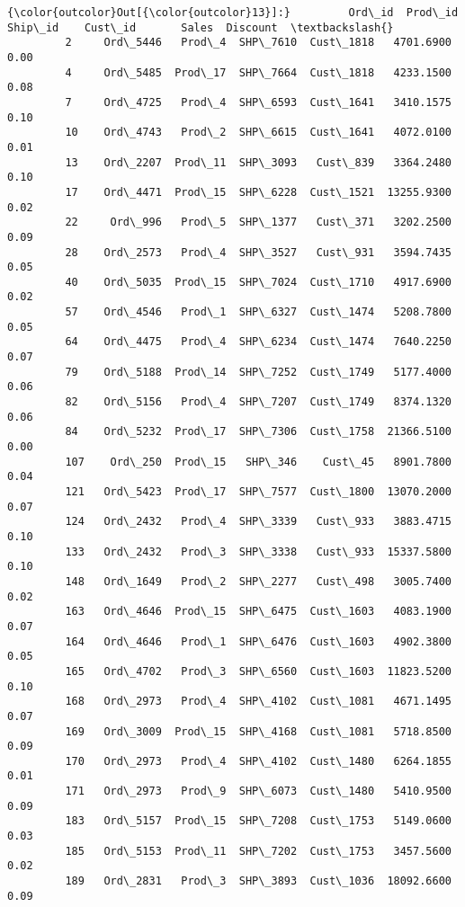 \documentclass[11pt]{article}
\begin{document}
\begin{Verbatim}[commandchars=\\\{\}]
{\color{outcolor}Out[{\color{outcolor}13}]:}         Ord\_id  Prod\_id   Ship\_id    Cust\_id       Sales  Discount  \textbackslash{}
         2     Ord\_5446   Prod\_4  SHP\_7610  Cust\_1818   4701.6900      0.00   
         4     Ord\_5485  Prod\_17  SHP\_7664  Cust\_1818   4233.1500      0.08   
         7     Ord\_4725   Prod\_4  SHP\_6593  Cust\_1641   3410.1575      0.10   
         10    Ord\_4743   Prod\_2  SHP\_6615  Cust\_1641   4072.0100      0.01   
         13    Ord\_2207  Prod\_11  SHP\_3093   Cust\_839   3364.2480      0.10   
         17    Ord\_4471  Prod\_15  SHP\_6228  Cust\_1521  13255.9300      0.02   
         22     Ord\_996   Prod\_5  SHP\_1377   Cust\_371   3202.2500      0.09   
         28    Ord\_2573   Prod\_4  SHP\_3527   Cust\_931   3594.7435      0.05   
         40    Ord\_5035  Prod\_15  SHP\_7024  Cust\_1710   4917.6900      0.02   
         57    Ord\_4546   Prod\_1  SHP\_6327  Cust\_1474   5208.7800      0.05   
         64    Ord\_4475   Prod\_4  SHP\_6234  Cust\_1474   7640.2250      0.07   
         79    Ord\_5188  Prod\_14  SHP\_7252  Cust\_1749   5177.4000      0.06   
         82    Ord\_5156   Prod\_4  SHP\_7207  Cust\_1749   8374.1320      0.06   
         84    Ord\_5232  Prod\_17  SHP\_7306  Cust\_1758  21366.5100      0.00   
         107    Ord\_250  Prod\_15   SHP\_346    Cust\_45   8901.7800      0.04   
         121   Ord\_5423  Prod\_17  SHP\_7577  Cust\_1800  13070.2000      0.07   
         124   Ord\_2432   Prod\_4  SHP\_3339   Cust\_933   3883.4715      0.10   
         133   Ord\_2432   Prod\_3  SHP\_3338   Cust\_933  15337.5800      0.10   
         148   Ord\_1649   Prod\_2  SHP\_2277   Cust\_498   3005.7400      0.02   
         163   Ord\_4646  Prod\_15  SHP\_6475  Cust\_1603   4083.1900      0.07   
         164   Ord\_4646   Prod\_1  SHP\_6476  Cust\_1603   4902.3800      0.05   
         165   Ord\_4702   Prod\_3  SHP\_6560  Cust\_1603  11823.5200      0.10   
         168   Ord\_2973   Prod\_4  SHP\_4102  Cust\_1081   4671.1495      0.07   
         169   Ord\_3009  Prod\_15  SHP\_4168  Cust\_1081   5718.8500      0.09   
         170   Ord\_2973   Prod\_4  SHP\_4102  Cust\_1480   6264.1855      0.01   
         171   Ord\_2973   Prod\_9  SHP\_6073  Cust\_1480   5410.9500      0.09   
         183   Ord\_5157  Prod\_15  SHP\_7208  Cust\_1753   5149.0600      0.03   
         185   Ord\_5153  Prod\_11  SHP\_7202  Cust\_1753   3457.5600      0.02   
         189   Ord\_2831   Prod\_3  SHP\_3893  Cust\_1036  18092.6600      0.09   

\end{Verbatim}
\end{document}

